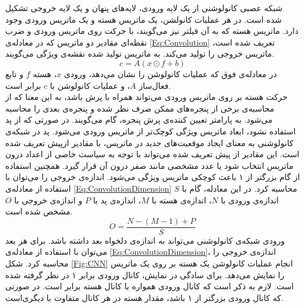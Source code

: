 شبکه عصبی کانولوشنی از یک لایه ورودی، لایه‌های پنهان و یک لایه خروجی تشکیل شده است. 
 در هر عملیات کانولشن، یک ماتریس هسته و یک ماتریس ورودی وجود دارد. ماتریس هسته که به آن فیلتر نیز می‌گویند، با حرکت روی ماتریس ورودی و ضرب نقطه‌ای مقادیر دو ماتریس که در معادله‌ی  \ref{Eq:Convolution} تعریف شده است، ماتریس خروجی را تولید می‌کند. به ماتریس تولید شده نقشه‌ی ویژگی می‌گویند. 
 \begin{equation}
 	c=A\left(x\odot f+b\right)
 \label{Eq:Convolution} 
\end{equation}
در معادله‌ی فوق که عملیات کانولوشن را نشان می‌دهد، ورودی $x$، هسته $f$ و تابع فعال‌ساز $A$، و عملیات کانولوشن با $c$ برابر است.\\
حرکت هسته بر روی ماتریس ورودی می‌تواند همراه با پرش باشد، به این معنا که از محاسبه‌ی برخی از پنجره‌های ممکن صرف نظر شده و پنجره‌ی بعدی را محاسبه می‌شود. به پارامتر تعیین کننده‌ی پرش پنجره، گام می‌گویند. در صورتی که از پد استفاده نشود، ابعاد ماتریس ویژگی کوچک‌تر از ماتریس ورودی می‌شود. پد در شبکه‌ی کانولوشنی به معنای ایجاد موقعیت‌های جدید در ماتریس، با مقادیر ازپیش تعریف شده است. این مقادیر از پیش تعریف شده می‌تواند با توجه به سیاست خاصی از اعداد درون ماتریس انتخاب شود یا عدد مشخصی مانند صفر درون آن قرار گیرد. همچنین استفاده از گام بزرگتر از ۱ باعث کوچکی ماتریس ویژگی می‌شود. اندازه‌ی خروجی را می‌توان با استفاده از معادله‌ی \ref{Eq:ConvolutionDimension} محاسبه کرد. در این معادله، گام با $S$ اندازه‌ی ورودی با $N$، اندازه‌ی هسته با $M$، اندازه‌ی پد با $P$ و اندازه‌ی خروجی با $O$ مشخص شده است.
  \begin{equation}
 	O=\frac{N - \left(M-1\right)+P}{S}
 	\label{Eq:ConvolutionDimension} 
 \end{equation}
ورودی شبکه‌ی کانولوشنی می‌تواند به اندازه‌ی دلخواه بعد داشته باشد. برای هر بعد می‌توان با استفاده از معادله‌ی \ref{Eq:ConvolutionDimension}، اندازه‌ی خروجی را محاسبه کرد. شکل \ref{Fig:CNN} انجام عملیات کانولوشن یک هسته بر روی یک ماتریس را نمایش می‌دهد. برای سادگی در نمایش، کانال ورودی برابر ۱ در نظر گرفته شده است. لازم به ذکر است که کانال ورودی همواره با کانال هسته برابر است. در صورتی که کانال ورودی بزرگتر از ۱ باشد، مقدار هسته در هر کانال متفاوت با دیگری‌است.
